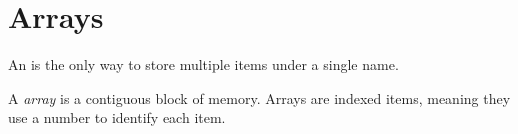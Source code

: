 \section{Arrays}\label{sec:Arrays}
An  is the only way to store multiple items under a single name.

\begin{definition}[Array]\label{def:Array}
  A \emph{array} is a contiguous block of memory.
  Arrays are indexed items, meaning they use a number to identify each item.
\end{definition}


